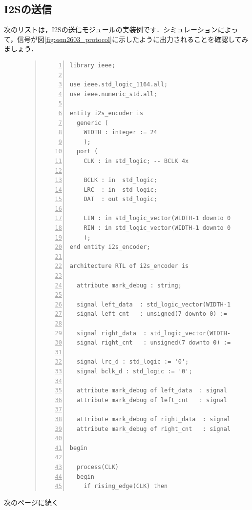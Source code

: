 \documentclass[a4paper,dvipdfmx]{jsarticle}
\begin{document}
\subsection{I2Sの送信}
次のリストは，I2Sの送信モジュールの実装例です．シミュレーションによって，信号が図\ref{fig:ssm2603_protocol}に示したように出力されることを確認してみましょう．

\begin{figure}[H]
\begin{quote}
\begin{Verbatim}[frame=single, numbers=left, baselinestretch=0.8]
library ieee;

use ieee.std_logic_1164.all;
use ieee.numeric_std.all;

entity i2s_encoder is
  generic (
    WIDTH : integer := 24
    );
  port (
    CLK : in std_logic; -- BCLK 4x

    BCLK : in  std_logic;
    LRC  : in  std_logic;
    DAT  : out std_logic;

    LIN : in std_logic_vector(WIDTH-1 downto 0);
    RIN : in std_logic_vector(WIDTH-1 downto 0)
    );
end entity i2s_encoder;

architecture RTL of i2s_encoder is

  attribute mark_debug : string;

  signal left_data  : std_logic_vector(WIDTH-1 downto 0) := (others => '0');
  signal left_cnt   : unsigned(7 downto 0) := (others => '0');

  signal right_data  : std_logic_vector(WIDTH-1 downto 0) := (others => '0');
  signal right_cnt   : unsigned(7 downto 0) := (others => '0');
  
  signal lrc_d : std_logic := '0';
  signal bclk_d : std_logic := '0';

  attribute mark_debug of left_data  : signal is "true";
  attribute mark_debug of left_cnt   : signal is "true";
  
  attribute mark_debug of right_data  : signal is "true";
  attribute mark_debug of right_cnt   : signal is "true";

begin

  process(CLK)
  begin
    if rising_edge(CLK) then
\end{Verbatim}
\end{quote}
\end{figure}
次のページに続く
\end{document}
